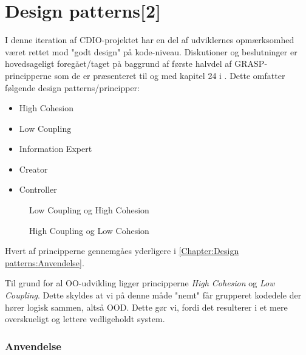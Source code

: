 \chapter{Design patterns[2]}\label{Chapter:Design patterns}
I denne iteration af CDIO-projektet \cite{CDIOdel2} har en del af udviklernes opmærksomhed været rettet mod "godt design" på kode-niveau. Diskutioner og beslutninger er hovedsageligt foregået/taget på baggrund af første halvdel af GRASP-principperne som de er præsenteret til og med kapitel 24 i \cite{umlbook}. Dette omfatter følgende design patterns/principper: 

\begin{itemize}
	\item High Cohesion    
	\item Low Coupling
	\item Information Expert
	\item Creator
	\item Controller
\end{itemize}

\begin{figure}
\caption{Low Coupling og High Cohesion}
\label{fig:lowCoupling}
\centering

\end{figure}

\begin{figure}
\caption{High Coupling og Low Cohesion}
\label{fig:highCoupling}
\centering

\end{figure}

Hvert af principperne gennemgåes yderligere i \vref{Chapter:Design patterns:Anvendelse}.

Til grund for al OO-udvikling ligger principperne \textit{High Cohesion} og \textit{Low Coupling}. Dette skyldes at vi på denne måde "nemt" får grupperet kodedele der hører logisk sammen, altså OOD. Dette gør vi, fordi det resulterer i et mere overskueligt og lettere vedligeholdt system.
 
\subsection{Anvendelse}\label{Chapter:Design patterns:Anvendelse}

